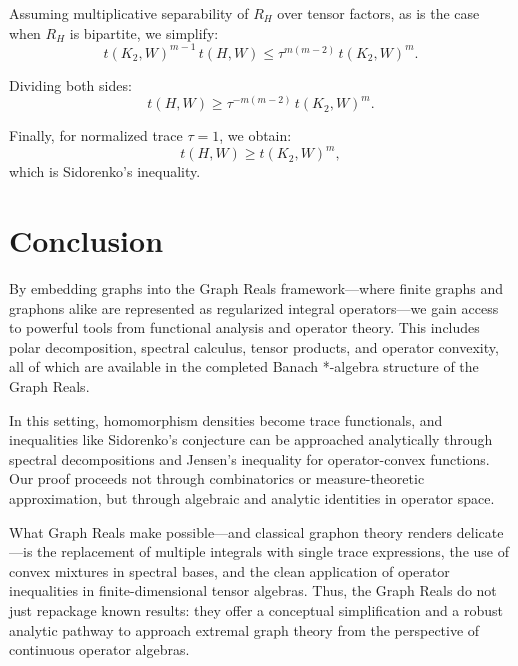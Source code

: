 \documentclass[11pt]{article}
\theoremstyle{definition}
\theoremstyle{plain}
\theoremstyle{remark}
\begin{document}
Assuming multiplicative separability of $R_H$ over tensor factors, as is the case when $R_H$ is bipartite, we simplify:
\[
t(K_2,W)^{m-1}\,t(H,W) \le \tau^{m(m-2)}\,t(K_2,W)^m.
\]

Dividing both sides:
\[
t(H, W) \ge \tau^{-m(m-2)}\,t(K_2, W)^m.
\]

Finally, for normalized trace $\tau = 1$, we obtain:
\[
t(H, W) \ge t(K_2, W)^m,
\]
which is Sidorenko’s inequality.

\section{Conclusion}

By embedding graphs into the Graph Reals framework—where finite graphs and graphons alike are represented as regularized integral operators—we gain access to powerful tools from functional analysis and operator theory. This includes polar decomposition, spectral calculus, tensor products, and operator convexity, all of which are available in the completed Banach *-algebra structure of the Graph Reals.

In this setting, homomorphism densities become trace functionals, and inequalities like Sidorenko’s conjecture can be approached analytically through spectral decompositions and Jensen’s inequality for operator-convex functions. Our proof proceeds not through combinatorics or measure-theoretic approximation, but through algebraic and analytic identities in operator space.

What Graph Reals make possible—and classical graphon theory renders delicate—is the replacement of multiple integrals with single trace expressions, the use of convex mixtures in spectral bases, and the clean application of operator inequalities in finite-dimensional tensor algebras. Thus, the Graph Reals do not just repackage known results: they offer a conceptual simplification and a robust analytic pathway to approach extremal graph theory from the perspective of continuous operator algebras.
\end{document}
